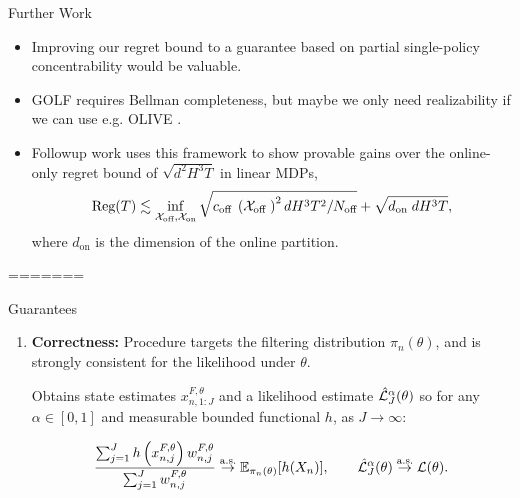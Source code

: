 \documentclass[final]{beamer}
\newcommand{\on}{\operatorname{on}}
\newlength{\colwidth}
\begin{document}
\begin{frame}[t]
\begin{columns}[t]
\begin{column}{\colwidth}
\begin{block}{Further Work}
    \begin{itemize}
        \item Improving our regret bound to a guarantee based on partial single-policy concentrability would be valuable.
        \item GOLF requires Bellman completeness, but maybe we only need realizability if we can use e.g. OLIVE \cite{du2021bilinear}.
        \item Followup work \cite{tan2024hybridreinforcementlearningbreaks} uses this framework to show provable gains over the online-only regret bound of $\sqrt{d^2H^3T}$ in linear MDPs, 
        $$\text{Reg}(T) \lesssim \inf _{\mathcal{X}_{\text {off}}, \mathcal{X}_{\text {on}}} \sqrt{c_{\text {off }}\left(\mathcal{X}_{\text {off }}\right)^2 d H^3 T^2 / N_{\text {off}}}+\sqrt{d_{\text {on }} d H^3 T},
        \vspace{-0.5ex}$$
        where $d_{\on}$ is the dimension of the online partition.
    \end{itemize}
\end{block}
=======
  \begin{alertblock}{Guarantees}
    \begin{enumerate}
        \item \textbf{Correctness:} Procedure targets the filtering distribution $\pi_n(\theta)$, and is strongly consistent for the likelihood under $\theta$.\footnotemark[1]
        
        Obtains state estimates $x_{n,1:J}^{F,\theta}$ and a likelihood estimate $\hat {\mathcal{L}}_J^\alpha(\theta)$ so for any $\alpha\in[0,1]$ and measurable bounded functional $h$, as $J \to \infty$:
        
  $$\frac{\sum_{j=1}^J h\left(x_{n, j}^{F, \theta}\right) w_{n, j}^{F, \theta}}{\sum_{j=1}^J w_{n, j}^{F, \theta}} \stackrel{\text{a.s.}}{\to} \mathbb{E}_{\pi_n(\theta)}[h(X_n)], \qquad \hat{\mathcal{L}}_J^\alpha(\theta) \stackrel{\text{a.s.}}{\to} \mathcal{L}(\theta).$$
  \vspace{1.5ex}
  

\end{enumerate}
\end{alertblock}
\end{column}
\end{columns}
\end{frame}
\end{document}
